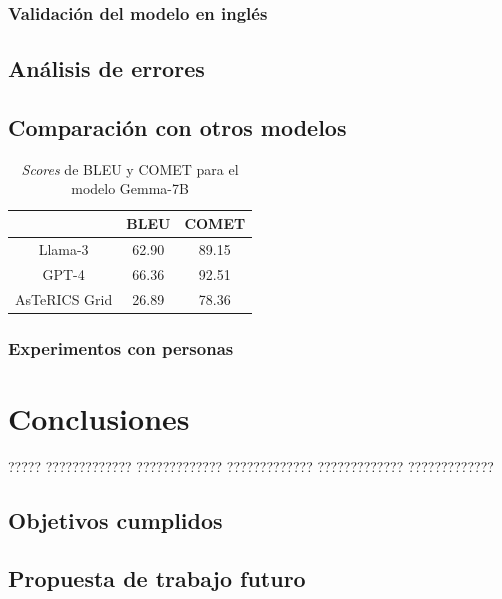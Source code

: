 \documentclass[11pt,spanish,listoffigures,listoftables]{tfgetsinf}
\begin{document}
\subsection{Validación del modelo en inglés}

\section{Análisis de errores}

\section{Comparación con otros modelos}

\begin{table}[!h]
\caption{\textit{Scores} de BLEU y COMET para el modelo Gemma-7B}
\begin{center}
\begin{tabular}{ c c c }
	\ & BLEU & COMET \\
	\hline
	\hline
	Llama-3 & 62.90 & 89.15  \\
	GPT-4 & 66.36 & 92.51\\
	AsTeRICS Grid & 26.89 & 78.36 \\

\end{tabular}
\end{center}
\end{table}

\subsection{Experimentos con personas}


\chapter{Conclusiones} \label{cap5}

????? ????????????? ????????????? ????????????? ????????????? ????????????? 

\section{Objetivos cumplidos}

\section{Propuesta de trabajo futuro}
\end{document}
